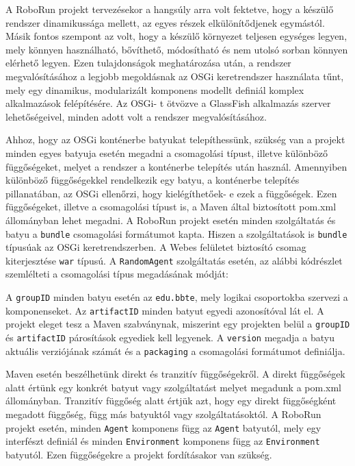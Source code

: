 A RoboRun projekt tervezésekor a hangsúly arra volt fektetve, hogy a készülő rendszer dinamikussága mellett, az egyes részek elkülönítődjenek egymástól. Másik fontos szempont az volt, hogy a készülő környezet teljesen egységes legyen, mely könnyen használható, bővíthető, módosítható és nem utolsó sorban könnyen elérhető legyen. Ezen tulajdonságok meghatározása után, a rendszer megvalósításához a legjobb megoldásnak az OSGi keretrendszer használata tűnt, mely egy dinamikus, modularizált komponens modellt definiál komplex alkalmazások felépítésére. Az OSGi- t ötvözve a GlassFish alkalmazás szerver lehetőségeivel, minden adott volt a rendszer megvalósításához.

Ahhoz, hogy az OSGi konténerbe batyukat telepíthessünk, szükség van a projekt minden egyes batyuja esetén megadni a csomagolási típust, illetve különböző függőségeket, melyet a rendszer a konténerbe telepítés után használ. Amennyiben különböző függőségekkel rendelkezik egy batyu, a konténerbe telepítés pillanatában, az OSGi ellenőrzi, hogy kielégíthetőek- e ezek a függőségek. Ezen függőségeket, illetve a csomagolási típust is, a Maven által biztosított pom.xml állományban lehet megadni. A RoboRun projekt esetén minden szolgáltatás és batyu a \texttt{bundle} csomagolási formátumot kapta. Hiszen a szolgáltatások is \texttt{bundle} típusúak az OSGi keretrendszerben. A Webes felületet biztosító csomag kiterjesztése \texttt{war} típusú. A \texttt{RandomAgent} szolgáltatás esetén, az alábbi kódrészlet szemlélteti a csomagolási típus megadásának módját:
\lstset{language=xml}


A \texttt{groupID} minden batyu esetén az \texttt{edu.bbte}, mely logikai csoportokba szervezi a komponenseket. Az \texttt{artifactID} minden batyut egyedi azonosítóval lát el. A projekt eleget tesz a Maven szabványnak, miszerint egy projekten belül a \texttt{groupID} és \texttt{artifactID} párosítások egyediek kell legyenek. A \texttt{version} megadja a batyu aktuális verziójának számát és a \texttt{packaging} a csomagolási formátumot definiálja.

Maven esetén beszélhetünk direkt és tranzitív függőségekről. A direkt függőségek alatt értünk egy konkrét batyut vagy szolgáltatást melyet megadunk a pom.xml állományban. Tranzitív függőség alatt értjük azt, hogy egy direkt függőségként megadott függőség, függ más batyuktól vagy szolgáltatásoktól. A RoboRun projekt esetén, minden \texttt{Agent} komponens függ az \texttt{Agent} batyutól, mely egy interfészt definiál és minden \texttt{Environment} komponens függ az \texttt{Environment} batyutól. Ezen függőségekre a projekt fordításakor van szükség.

